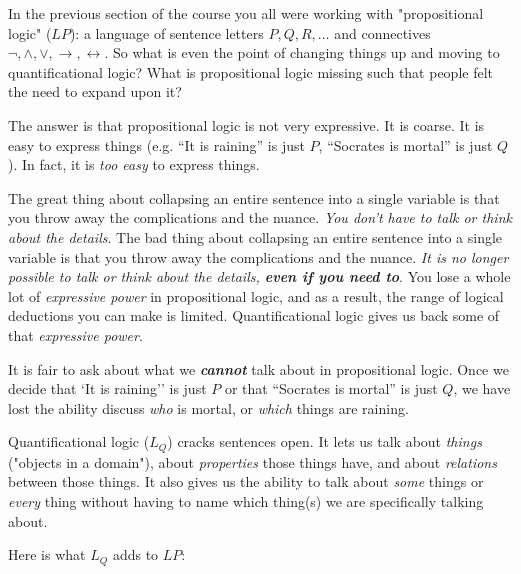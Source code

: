 \documentclass[11pt]{article}
\begin{document}
In the previous section of the course you all were working with "propositional logic" ($LP$): a language of sentence letters $P, Q, R, \dots$ and connectives $\neg, \wedge, \vee, \to, \leftrightarrow$. So what is even the point of changing things up and moving to quantificational logic? What is propositional logic missing such that people felt the need to expand upon it?


The answer is that propositional logic is not very expressive. It is coarse. It is easy to express things (e.g. ``It is raining'' is just $P$, ``Socrates is mortal'' is just $Q$). In fact, it is \textit{too easy} to express things. 


The great thing about collapsing an entire sentence into a single variable is that you throw away the complications and the nuance. \textit{You don't have to talk or think about the details}. The bad thing about collapsing an entire sentence into a single variable is that you throw away the complications and the nuance. \textit{It is no longer possible to talk or think about the details, \textbf{even if you need to}}. You lose a whole lot of \textit{expressive power} in propositional logic, and as a result, the range of logical deductions you can make is limited. Quantificational logic gives us back some of that \textit{expressive power}. 

It is fair to ask about what we \textit{\textbf{cannot}} talk about in propositional logic. Once we decide that `It is raining'' is just $P$ or that ``Socrates is mortal'' is just $Q$, we have lost the ability discuss \emph{who} is mortal, or \emph{which} things are raining.

Quantificational logic ($L_Q$) cracks sentences open. It lets us talk about \emph{things} ("objects in a domain"), about \emph{properties} those things have, and about \emph{relations} between those things. It also gives us the ability to talk about \emph{some} things or \emph{every} thing without having to name which thing(s) we are specifically talking about.

Here is what $L_Q$ adds to $LP$:
\end{document}
